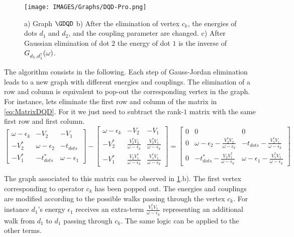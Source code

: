 \documentclass[showpacs,aps,prb,reprint,superscriptaddress]{revtex4-1}
\begin{document}
\begin{figure}[t]
    \centering
    \texttt{[image: IMAGES/Graphs/DQD-Pro.png]}
    \caption{ a) Graph $\GDQD$ b) After the elimination of vertex $c_k$, the energies of dots $d_1$ and $d_2$, and the coupling parameter are changed. c) After Gaussian elimination of dot $2$ the energy of dot $1$ is the inverse of $G_{d_1,d^\dagger_1}(\omega)$. \protect{}}
    \label{fig:graphDQD}
\end{figure}


The algorithm consists in the following. Each step of Gauss-Jordan elimination leads to a new graph with different energies and couplings. The elimination of a row and column is equivalent to pop-out the corresponding vertex in the graph. For instance, lets eliminate the first row and column of the matrix in \eqref{eq:MatrixDQD}. For it we just need to subtract the rank-$1$ matrix with the same first row and first column. 
\begin{equation}
        \left[\begin{array}{ccc}
    \omega-\epsilon_{k} & -V_{2} & -V_{1}\\
    -V_{2}^{*} & \omega-\epsilon_{2} & -t_{dots}\\
    -V_{1}^{*} & -t_{dots}^{*} & \omega-\epsilon_{1}
    \end{array}\right]-\left[\begin{array}{ccc}
    \omega-\epsilon_{k} & -V_{2} & -V_{1}\\
    -V_{2}^{*} & \frac{V_{2}^{*}V_{2}}{\omega-\epsilon_{k}} & \frac{V_{2}^{*}V_{1}}{\omega-\epsilon_{k}}\\
    -V_{1}^{*} & \frac{V_{2}V_{1}^{*}}{\omega-\epsilon_{k}} & \frac{V_{1}^{*}V_{1}}{\omega-\epsilon_{k}}
    \end{array}\right]=\left[\begin{array}{ccc}
    0 & 0 & 0\\
    0 & \omega-\epsilon_{2}-\frac{V_{2}^{*}V_{2}}{\omega-\epsilon_{k}} & -t_{dots}-\frac{V_{2}^{*}V_{1}}{\omega-\epsilon_{k}}\\
    0 & -t_{dots}^{*}-\frac{V_{2}V_{1}^{*}}{\omega-\epsilon_{k}} & \omega-\epsilon_{1}-\frac{V_{1}^{*}V_{1}}{\omega-\epsilon_{k}}
    \end{array}\right]
    \label{eq:Gauss-Jordan} 
\end{equation}

The graph associated to this matrix can be observed in \ref{fig:graphDQD}.b). The first vertex corresponding to operator $c_k$ has been popped out. The energies and couplings are modified according to the possible walks passing through the vertex $c_k$.  For instance $d_1$'s energy $\epsilon_1$ receives an extra-term $\frac{V_{1}^{*}V_{1}}{\omega-\epsilon_{k}}$ representing an additional walk  from $d_1$ to $d_1$ passing through  $c_k$. The same logic can be applied to the other terms.  
\end{document}
